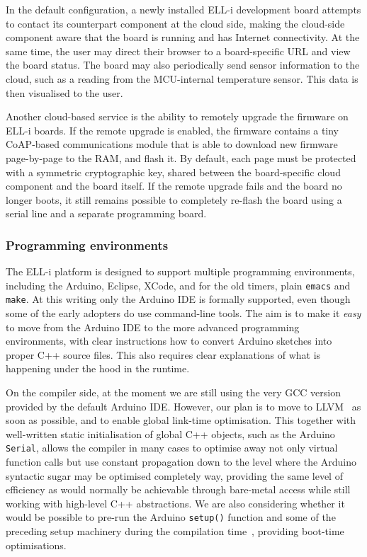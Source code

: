 \documentclass{siamltex}
\begin{document}
In the default configuration, a newly installed ELL-i development
board attempts to contact its counterpart component at the cloud
side, making the cloud-side component aware that the board is running
and has Internet connectivity.  At the same time, the user may direct
their browser to a board-specific URL and view the board status.  The
board may also periodically send sensor information to the cloud, such
as a reading from the MCU-internal temperature sensor.  This data is
then visualised to the user.

Another cloud-based service is the ability to remotely upgrade the
firmware on ELL-i boards.  If the remote upgrade is enabled, the
firmware contains a tiny CoAP-based communications module that is able
to download new firmware page-by-page to the RAM, and flash it.  By
default, each page must be protected with a symmetric cryptographic
key, shared between the board-specific cloud component and the board
itself.  If the remote upgrade fails and the board no longer boots, it
still remains possible to completely re-flash the board using a serial
line and a separate programming board.


\subsubsection{Programming environments}

The ELL-i platform is designed to support multiple programming
environments, including the Arduino, Eclipse, XCode, and for the
old timers, plain \hbox{\tt emacs} and \hbox{\tt make}.  At this
writing only the Arduino IDE is formally supported, even though some
of the early adopters do use command-line tools.  The aim is to make
it {\it easy} to move from the Arduino IDE to the more advanced
programming environments, with clear instructions how to convert
Arduino sketches into proper C++ source files.  This also requires
clear explanations of what is happening under the hood in the runtime.

On the compiler side, at the moment we are still using the very GCC
version provided by the default Arduino IDE.  However, our plan is to
move to LLVM~\cite{lattner2004llvm} as soon as possible, and to enable global
link-time optimisation.  This together with well-written static
initialisation of global C++ objects, such as the Arduino \hbox{\tt
  Serial}, allows the compiler in many cases to optimise away not only
virtual function calls but use constant propagation down to the level
where the Arduino syntactic sugar may be optimised completely way,
providing the same level of efficiency as would normally be
achievable through bare-metal access while still working with
high-level C++ abstractions.  We are also considering whether it would
be possible to pre-run the Arduino \hbox{\tt setup()} function and
some of the preceding setup machinery during the compilation
time~\cite{rintaaho2012clicktofpga}, providing boot-time optimisations.
\end{document}
